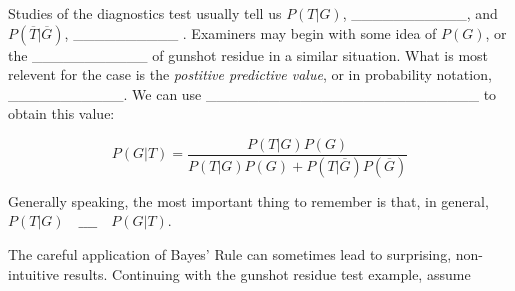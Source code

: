 \documentclass[]{book}
\theoremstyle{definition}
\theoremstyle{definition}
\theoremstyle{remark}
\begin{document}
Studies of the diagnostics test usually tell us \(P(T|G)\),
\_\_\_\_\_\_\_\_\_\_\_, and \(P(\overline{T}|\overline{G})\),
\_\_\_\_\_\_\_\_\_\_ . Examiners may begin with some idea of \(P(G)\),
or the \_\_\_\_\_\_\_\_\_\_\_ of gunshot residue in a similar situation.
What is most relevent for the case is the \emph{postitive predictive
value}, or in probability notation, \_\_\_\_\_\_\_\_\_\_\_. We can use
\_\_\_\_\_\_\_\_\_\_\_\_\_\_\_\_\_\_\_\_\_\_\_\_\_\_ to obtain this
value:

\[ P(G|T) = \frac{P(T|G)P(G)}{P(T|G)P(G) + P(T|\overline{G})P(\overline{G})}\]

Generally speaking, the most important thing to remember is that, in
general, \(P(T|G) \quad \_\_\_\_ \quad P(G|T)\).

The careful application of Bayes' Rule can sometimes lead to surprising,
non-intuitive results. Continuing with the gunshot residue test example,
assume
\end{document}
